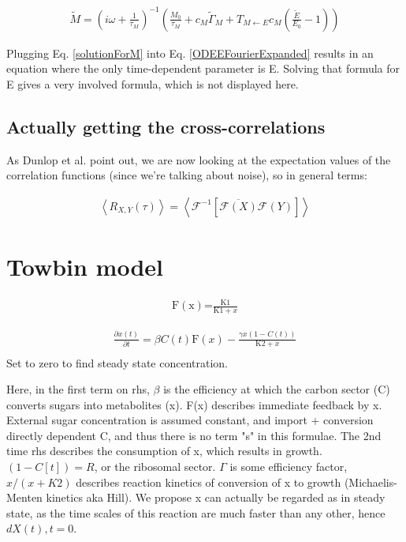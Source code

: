 \begin{align}
\label{solutionForM}
\tilde{M} = \left( i \omega + \frac{1}{\tau_M} \right)^{-1} \left( \frac{M_0}{\tau_M} + c_M \tilde{\Gamma}_M + T_{M \leftarrow E} c_M (\frac{\tilde{E}}{E_0} - 1) \right)
\end{align}

Plugging Eq. \ref{solutionForM} into Eq. \ref{ODEEFourierExpanded} results in an equation where the only time-dependent parameter is E.
Solving that formula for E gives a very involved formula, which is not displayed here.

\subsection{Actually getting the cross-correlations}

As Dunlop et al. point out, we are now looking at the expectation values of the correlation functions (since we're talking about noise), so in general terms:

\begin{align}
\left< R_{X,Y}(\tau)\right > = 
\left< \mathcal{F}^{-1} \left[ \overline{\mathcal{F} (X)} \mathcal{F}(Y) \right] \right>
\end{align}

\section{Towbin model}

\begin{align}
\text{F}(\text{x})\text{=}\frac{\text{K1}}{\text{K1}+x}
\end{align}

\begin{align}
\frac{\partial x(t)}{\partial t}=\beta  C(t) \text{F}(x)-\frac{\gamma  x \left(1-C(t)\right)}{\text{K2}+x} \\
\end{align}
Set to zero to find steady state concentration.

Here, in the first term on rhs, $\beta$ is the efficiency at which the carbon sector (C) converts sugars into metabolites (x). F(x) describes immediate feedback by x. External sugar concentration is assumed constant, and import + conversion directly dependent C, and thus there is no term "s" in this formulae.
The 2nd time rhs describes the consumption of x, which results in growth. $(1-C[t]) = R$, or the ribosomal sector. $\Gamma$ is some efficiency factor, $x/(x+K2)$ describes reaction kinetics of conversion of x to growth (Michaelis-Menten kinetics aka Hill). 
We propose x can actually be regarded as in steady state, as the time scales of this reaction are much faster than any other, hence $dX(t),t = 0$. 

